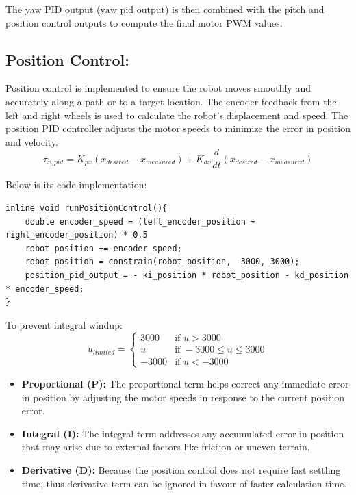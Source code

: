 The yaw PID output ($\text{yaw\_pid\_output}$) is then combined with the pitch and position control outputs to compute the final motor PWM values.

\subsection{Position Control:}
Position control is implemented to ensure the robot moves smoothly and accurately along a path or to a target location. The encoder feedback from the left and right wheels is used to calculate the robot's displacement and speed. The position PID controller adjusts the motor speeds to minimize the error in position and velocity.
\begin{equation}
	\tau_{x,pid} = K_{px}(x_{desired} - x_{measured}) + K_{dx}\frac{d}{dt}(x_{desired} - x_{measured})
\end{equation}

Below is its code implementation:
\begin{lstlisting}[style=cppstyle]
inline void runPositionControl(){
	double encoder_speed = (left_encoder_position + right_encoder_position) * 0.5
	robot_position += encoder_speed;
	robot_position = constrain(robot_position, -3000, 3000);
	position_pid_output = - ki_position * robot_position - kd_position * encoder_speed;
}
\end{lstlisting}

To prevent integral windup:
\begin{equation}
	u_{limited} = \begin{cases}
		3000 & \text{if } u > 3000 \\
		u & \text{if } -3000 \leq u \leq 3000 \\
		-3000 & \text{if } u < -3000
	\end{cases}
\end{equation}

\begin{itemize}
	\item \textbf{Proportional (P):} The proportional term helps correct any immediate error in position by adjusting the motor speeds in response to the current position error.
	\item \textbf{Integral (I):} The integral term addresses any accumulated error in position that may arise due to external factors like friction or uneven terrain.
	\item \textbf{Derivative (D):} Because the position control does not require fast settling time, thus derivative term can be ignored in favour of faster calculation time.
	
\end{itemize}

